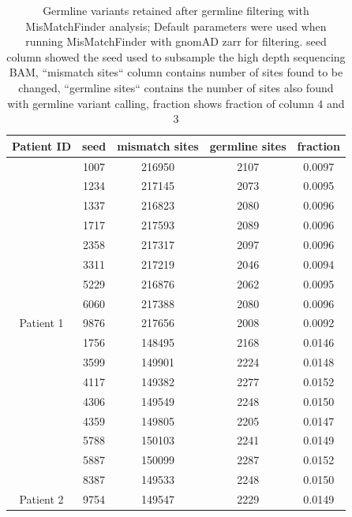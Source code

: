 \begin{table}
\caption[Germline variants retained after germline filtering]{Germline variants retained after germline filtering with MisMatchFinder analysis; Default parameters were used when running MisMatchFinder with gnomAD zarr for filtering. seed column showed the seed used to subsample the high depth sequencing BAM, ``mismatch sites`` column contains number of sites found to be changed, ``germline sites`` contains the number of sites also found with germline variant calling, fraction shows fraction of column 4 and 3}\label{tab:mmf-germlineArtifacts}
\centering
\begin{tabular}{|c|c|c|c|c|}
\toprule
\hline
\textbf{Patient ID} & \textbf{seed} & \textbf{mismatch sites} & \textbf{germline sites} & \textbf{fraction} \\
\hline
 & \num{1007} & \num{216950} &  \num{2107} & \num{0.0097}\\ 
 & \num{1234} & \num{217145} &  \num{2073} & \num{0.0095}\\ 
 & \num{1337} & \num{216823} &  \num{2080} & \num{0.0096}\\ 
 & \num{1717} & \num{217593} &  \num{2089} & \num{0.0096}\\ 
 & \num{2358} & \num{217317} &  \num{2097} & \num{0.0096}\\ 
 & \num{3311} & \num{217219} &  \num{2046} & \num{0.0094}\\ 
 & \num{5229} & \num{216876} &  \num{2062} & \num{0.0095}\\ 
 & \num{6060} & \num{217388} &  \num{2080} & \num{0.0096}\\ 
\multirow{-9}{*}{Patient 1} & \num{9876} & \num{217656} &  \num{2008} & \num{0.0092}\\ 
\hline
 & \num{1756} & \num{148495} &  \num{2168} & \num{0.0146}\\ 
 & \num{3599} & \num{149901} &  \num{2224} & \num{0.0148}\\ 
 & \num{4117} & \num{149382} &  \num{2277} & \num{0.0152}\\ 
 & \num{4306} & \num{149549} &  \num{2248} & \num{0.0150}\\ 
 & \num{4359} & \num{149805} &  \num{2205} & \num{0.0147}\\ 
 & \num{5788} & \num{150103} &  \num{2241} & \num{0.0149}\\ 
 & \num{5887} & \num{150099} &  \num{2287} & \num{0.0152}\\ 
 & \num{8387} & \num{149533} &  \num{2248} & \num{0.0150}\\ 
\multirow{-9}{*}{Patient 2} & \num{9754} & \num{149547} &  \num{2229} & \num{0.0149}\\
\hline
\bottomrule
\end{tabular}
\end{table}


